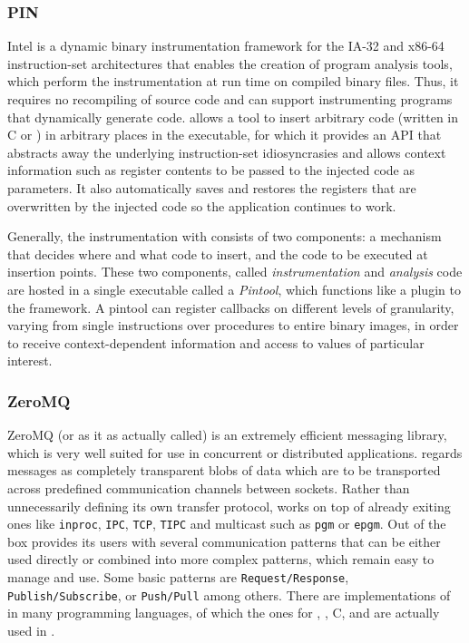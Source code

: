 \subsubsection{PIN}
{\small Intel} \pin\cite{pin} is a dynamic binary instrumentation framework for the IA-32 and x86-64 instruction-set architectures 
that enables the creation of program analysis tools, which perform the instrumentation at run time on  
compiled binary files. Thus, it requires no recompiling of source code and can support instrumenting programs that dynamically generate code.
\pin allows a tool to insert arbitrary code (written in {\small C} or \cpp) in arbitrary places in the executable, for which it 
provides an API that abstracts away the underlying instruction-set idiosyncrasies and allows context information 
such as register contents to be passed to the injected code as parameters. It also automatically saves and restores 
the registers that are overwritten by the injected code so the application continues to work.

Generally, the instrumentation with \pin consists of two components: a mechanism that decides where and what code to insert, 
and the code to be executed at insertion points. These two components, called \emph{instrumentation} and \emph{analysis} 
code are hosted in a single executable called a \emph{Pintool}, which functions like a plugin to the \pin framework.
A pintool can register callbacks on different levels of granularity, varying from single instructions over procedures
to entire binary images, in order to receive context-dependent information and access to values of particular interest.
\subsubsection{ZeroMQ}
\label{sec:zmq}
{\small ZeroMQ}\cite{zmq} (or \zmq as it as actually called) is an extremely efficient messaging library, 
which is very well suited for use in concurrent or distributed applications. \zmq regards messages as 
completely transparent blobs of data which are to be transported across predefined communication channels 
between sockets. Rather than unnecessarily defining its own transfer protocol, \zmq works on top of already exiting 
ones like \texttt{inproc}, \texttt{IPC}, \texttt{TCP}, \texttt{TIPC} and multicast such as \texttt{pgm} or \texttt{epgm}.
Out of the box \zmq provides its users with several communication patterns that can be either used directly or combined 
into more complex patterns, which remain easy to manage and use. Some basic patterns are \texttt{Request/Response}, 
\texttt{Publish/Subscribe}, or \texttt{Push/Pull} among others.
There are implementations of \zmq in many programming languages, of which the ones for \java, \python, {\small C}, 
and \cpp are actually used in \xmlmate. 

